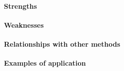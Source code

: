 \paragraph{Strengths}
\paragraph{Weaknesses}
\paragraph{Relationships with other methods}
\paragraph{Examples of application}

